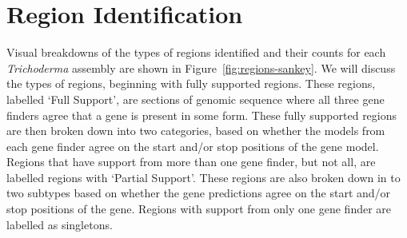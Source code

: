 \section{Region Identification}\label{section:regions}

Visual breakdowns of the types of regions identified and their counts
for each \textit{Trichoderma} assembly are shown in
Figure~\ref{fig:regions-sankey}. We will discuss the types of regions,
beginning with fully supported regions. These regions, labelled `Full
Support', are sections of genomic sequence where all three gene
finders agree that a gene is present in some form. These fully
supported regions are then broken down into two categories, based on
whether the models from each gene finder agree on the start and/or
stop positions of the gene model. Regions that have support from more
than one gene finder, but not all, are labelled regions with `Partial
Support'. These regions are also broken down in to two subtypes based
on whether the gene predictions agree on the start and/or stop
positions of the gene. Regions with support from only one gene finder
are labelled as singletons.

